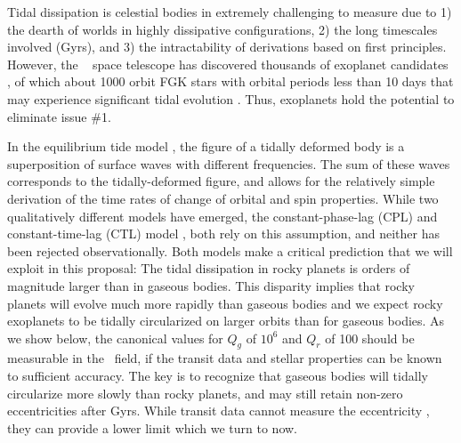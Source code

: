 \medskip
{\centerline{}}
\smallskip

Tidal dissipation is celestial bodies in extremely challenging to
measure
\cite{GoldreichSoter66,Hut81,AksnesFranklin01,Jackson08a,Jackson09,Makarov12}
due to 1) the dearth of worlds in highly dissipative configurations,
2) the long timescales involved (Gyrs), and 3) the intractability of
derivations based on first principles. However, the \kepler~ space
telescope has discovered thousands of exoplanet candidates
\cite{Batalha12}, of which about 1000 orbit FGK stars with orbital
periods less than 10 days that may experience significant tidal
evolution \cite{Rasio96,Jackson08a,Matsumura10}. Thus, exoplanets hold
the potential to eliminate issue \#1.

In the equilibrium tide model
\cite{Darwin1880,Jeffries56,MacDonald64,GoldreichSoter66,Hut81,FerrazMello08,Leconte10},
the figure of a tidally deformed body is a superposition of surface
waves with different frequencies. The sum of these waves corresponds
to the tidally-deformed figure, and allows for the relatively simple
derivation of the time rates of change of orbital and spin
properties. While two qualitatively different models have emerged, the
constant-phase-lag (CPL) and constant-time-lag (CTL) model
\cite{Greenberg09}, both rely on this assumption, and neither has been
rejected observationally. Both models make a critical prediction that
we will exploit in this proposal: The tidal dissipation in rocky
planets is orders of magnitude larger than in gaseous bodies. This
disparity implies that rocky planets will evolve much more rapidly
than gaseous bodies and we expect rocky exoplanets to be tidally
circularized on larger orbits than for gaseous bodies. As we show
below, the canonical values for $Q_g$ of $10^6$ and $Q_r$ of 100
should be measurable in the \kepler~field, if the transit data and
stellar properties can be known to sufficient accuracy. The key is to
recognize that gaseous bodies will tidally circularize more slowly
than rocky planets, and may still retain non-zero eccentricities after
Gyrs. While transit data cannot measure the eccentricity
\cite{Barnes07}, they can provide a lower limit which we turn to now.

\medskip
{\centerline{}}
\smallskip

